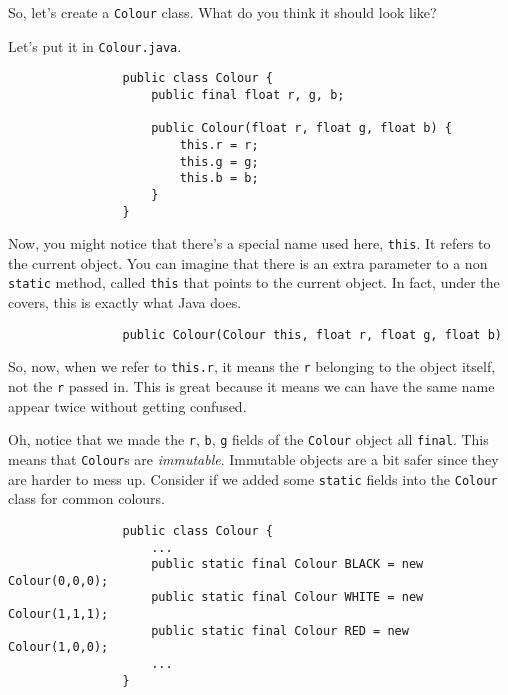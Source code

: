 \documentclass{article}
\begin{document}
            So, let's create a \texttt{Colour} class.  What do you think it should look like?
        
            Let's put it in \texttt{Colour.java}.  

            \begin{verbatim}
                public class Colour {
                    public final float r, g, b;
                
                    public Colour(float r, float g, float b) {
                        this.r = r;
                        this.g = g;
                        this.b = b;
                    }
                }
            \end{verbatim}
        
            Now, you might notice that there's a special name used here, \texttt{this}. It refers to the current object. You can imagine
            that there is an extra parameter to a non \texttt{static} method, called \texttt{this} that points to the current object. In
            fact, under the covers, this is exactly what Java does.

            \begin{verbatim}                
                public Colour(Colour this, float r, float g, float b)
            \end{verbatim}
        
            So, now, when we refer to \texttt{this.r}, it means the \texttt{r} belonging to the object itself, not the \texttt{r} passed in.
            This is great because it means we can have the same name appear twice without getting confused.
        
            Oh, notice that we made the \texttt{r}, \texttt{b}, \texttt{g} fields of the \texttt{Colour} object all \texttt{final}. This
            means that \texttt{Colour}s are \emph{immutable}. Immutable objects are a bit safer since they are harder to mess up. Consider
            if we added some \texttt{static} fields into the \texttt{Colour} class for common colours.
        
            \begin{verbatim}
                public class Colour {
                    ...
                    public static final Colour BLACK = new Colour(0,0,0);
                    public static final Colour WHITE = new Colour(1,1,1);
                    public static final Colour RED = new Colour(1,0,0);
                    ...
                }
            \end{verbatim}
        
\end{document}
